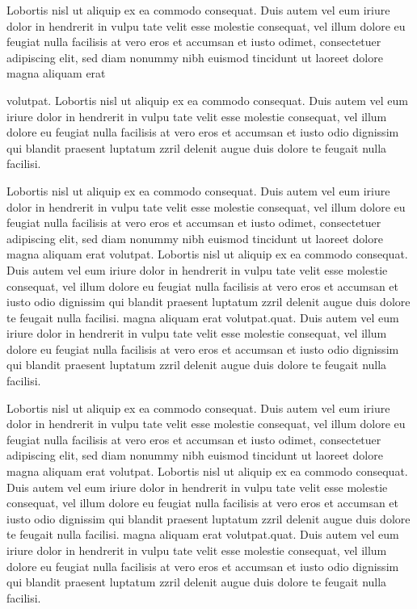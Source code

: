 \documentclass[a4paper, oneside, twocolumn, notitlepage, 10pt]{extarticle_ecoc}
\begin{document}
Lobortis nisl ut aliquip ex ea commodo consequat. Duis autem vel eum
iriure dolor in hendrerit in vulpu tate velit esse molestie
consequat, vel illum dolore eu feugiat nulla facilisis at vero eros
et accumsan et iusto odimet, consectetuer adipiscing elit, sed diam
nonummy nibh euismod tincidunt ut laoreet dolore magna aliquam erat



volutpat. Lobortis nisl ut aliquip ex ea commodo consequat. Duis
autem vel eum iriure dolor in hendrerit in vulpu tate velit esse
molestie consequat, vel illum dolore eu feugiat nulla facilisis at
vero eros et accumsan et iusto odio dignissim qui blandit praesent
luptatum zzril delenit augue duis dolore te feugait nulla facilisi.

Lobortis nisl ut aliquip ex ea commodo consequat. Duis autem vel eum
iriure dolor in hendrerit in vulpu tate velit esse molestie
consequat, vel illum dolore eu feugiat nulla facilisis at vero eros
et accumsan et iusto odimet, consectetuer adipiscing elit, sed diam
nonummy nibh euismod tincidunt ut laoreet dolore magna aliquam erat
volutpat. Lobortis nisl ut aliquip ex ea commodo consequat. Duis
autem vel eum iriure dolor in hendrerit in vulpu tate velit esse
molestie consequat, vel illum dolore eu feugiat nulla facilisis at
vero eros et accumsan et iusto odio dignissim qui blandit praesent
luptatum zzril delenit augue duis dolore te feugait nulla facilisi.
magna aliquam erat volutpat.quat. Duis autem vel eum iriure dolor in
hendrerit in vulpu tate velit esse molestie consequat, vel illum
dolore eu feugiat nulla facilisis at vero eros et accumsan et iusto
odio dignissim qui blandit praesent luptatum zzril delenit augue
duis dolore te feugait nulla facilisi.

Lobortis nisl ut aliquip ex ea commodo consequat. Duis autem vel eum
iriure dolor in hendrerit in vulpu tate velit esse molestie
consequat, vel illum dolore eu feugiat nulla facilisis at vero eros
et accumsan et iusto odimet, consectetuer adipiscing elit, sed diam
nonummy nibh euismod tincidunt ut laoreet dolore magna aliquam erat
volutpat. Lobortis nisl ut aliquip ex ea commodo consequat. Duis
autem vel eum iriure dolor in hendrerit in vulpu tate velit esse
molestie consequat, vel illum dolore eu feugiat nulla facilisis at
vero eros et accumsan et iusto odio dignissim qui blandit praesent
luptatum zzril delenit augue duis dolore te feugait nulla facilisi.
magna aliquam erat volutpat.quat. Duis autem vel eum iriure dolor in
hendrerit in vulpu tate velit esse molestie consequat, vel illum
dolore eu feugiat nulla facilisis at vero eros et accumsan et iusto
odio dignissim qui blandit praesent luptatum zzril delenit augue
duis dolore te feugait nulla facilisi.
\end{document}
